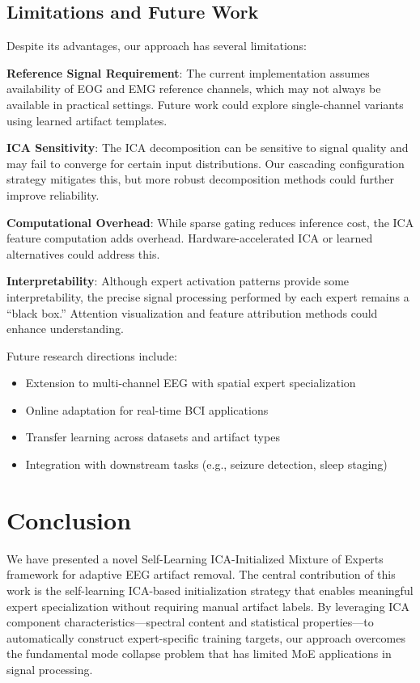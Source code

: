 \documentclass[journal]{IEEEtran}
\begin{document}
\subsection{Limitations and Future Work}

Despite its advantages, our approach has several limitations:

\textbf{Reference Signal Requirement}: The current implementation assumes availability of EOG and EMG reference channels, which may not always be available in practical settings. Future work could explore single-channel variants using learned artifact templates.

\textbf{ICA Sensitivity}: The ICA decomposition can be sensitive to signal quality and may fail to converge for certain input distributions. Our cascading configuration strategy mitigates this, but more robust decomposition methods could further improve reliability.

\textbf{Computational Overhead}: While sparse gating reduces inference cost, the ICA feature computation adds overhead. Hardware-accelerated ICA or learned alternatives could address this.

\textbf{Interpretability}: Although expert activation patterns provide some interpretability, the precise signal processing performed by each expert remains a ``black box.'' Attention visualization and feature attribution methods could enhance understanding.

Future research directions include:
\begin{itemize}
\item Extension to multi-channel EEG with spatial expert specialization
\item Online adaptation for real-time BCI applications
\item Transfer learning across datasets and artifact types
\item Integration with downstream tasks (e.g., seizure detection, sleep staging)
\end{itemize}

\section{Conclusion}
\label{sec:conclusion}

We have presented a novel Self-Learning ICA-Initialized Mixture of Experts framework for adaptive EEG artifact removal. The central contribution of this work is the self-learning ICA-based initialization strategy that enables meaningful expert specialization without requiring manual artifact labels. By leveraging ICA component characteristics---spectral content and statistical properties---to automatically construct expert-specific training targets, our approach overcomes the fundamental mode collapse problem that has limited MoE applications in signal processing.
\end{document}
